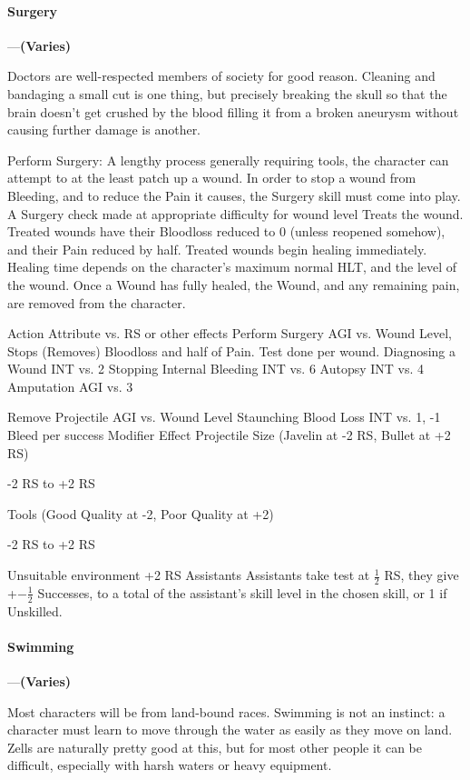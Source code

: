 \documentclass[oneside,11pt,english]{book}
\begin{document}
 

 

\paragraph{\label{skill:Surgery}Surgery}---\quad\textbf{(Varies)}\par
Doctors are well-respected members of society for good reason. Cleaning and bandaging a small cut is one thing, but precisely breaking the skull so that the brain doesn’t get crushed by the blood filling it from a broken aneurysm without causing further damage is another.


Perform Surgery: A lengthy process generally requiring tools, the character can attempt to at the least patch up a wound. In order to stop a wound from Bleeding, and to reduce the Pain it causes, the Surgery skill must come into play. A Surgery check made at appropriate difficulty for wound level Treats the wound. Treated wounds have their Bloodloss reduced to 0 (unless reopened somehow), and their Pain reduced by half. Treated wounds begin healing immediately. Healing time depends on the character’s maximum normal HLT, and the level of the wound. Once a Wound has fully healed, the Wound, and any remaining pain, are removed from the character.


Action Attribute vs. RS or other effects 
Perform Surgery AGI vs. Wound Level, Stops (Removes) Bloodloss and half of Pain. 
Test done per wound. 
Diagnosing a Wound INT vs. 2 
Stopping Internal Bleeding INT vs. 6 
Autopsy INT vs. 4 
Amputation AGI vs. 3 


Remove Projectile AGI vs. Wound Level 
Staunching Blood Loss INT vs. 1, -1 Bleed per success 
Modifier Effect 
Projectile Size (Javelin at -2 
RS, Bullet at +2 RS) 

-2 RS to +2 RS 

Tools (Good Quality at -2, Poor 
Quality at +2) 

-2 RS to +2 RS 

Unsuitable environment +2 RS 
Assistants Assistants take test at $ \frac{1}{2} $ RS, they give +$ -\frac{1}{2} $ Successes, to a total of the 
assistant’s skill level in the chosen skill, or 1 if Unskilled. 

 

 

\paragraph{\label{skill:Swimming}Swimming}---\quad\textbf{(Varies)}\par
Most characters will be from land-bound races. Swimming is not an instinct: a character must learn to move through the water as easily as they move on land. Zells are naturally pretty good at this, but for most other people it can be difficult, especially with harsh waters or heavy equipment.
\end{document}

